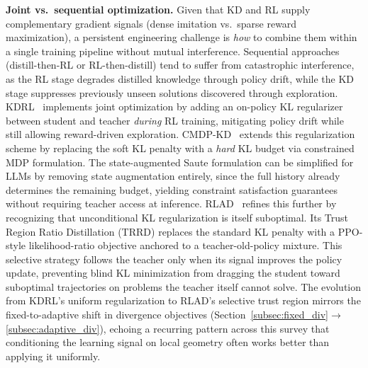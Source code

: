 \documentclass{article} %
\begin{document}
\textbf{Joint vs.\ sequential optimization.} Given that KD and RL supply complementary gradient signals (dense imitation vs.\ sparse reward maximization), a persistent engineering challenge is \emph{how} to combine them within a single training pipeline without mutual interference. Sequential approaches (distill-then-RL or RL-then-distill) tend to suffer from catastrophic interference, as the RL stage degrades distilled knowledge through policy drift, while the KD stage suppresses previously unseen solutions discovered through exploration. KDRL~\citep{2506.02208} implements joint optimization by adding an on-policy KL regularizer between student and teacher \emph{during} RL training, mitigating policy drift while still allowing reward-driven exploration. CMDP-KD~\citep{2509.22921} extends this regularization scheme by replacing the soft KL penalty with a \emph{hard} KL budget via constrained MDP formulation. The state-augmented Saute formulation can be simplified for LLMs by removing state augmentation entirely, since the full history already determines the remaining budget, yielding constraint satisfaction guarantees without requiring teacher access at inference. RLAD~\citep{2602.22495} refines this further by recognizing that unconditional KL regularization is itself suboptimal. Its Trust Region Ratio Distillation (TRRD) replaces the standard KL penalty with a PPO-style likelihood-ratio objective anchored to a teacher-old-policy mixture. This selective strategy follows the teacher only when its signal improves the policy update, preventing blind KL minimization from dragging the student toward suboptimal trajectories on problems the teacher itself cannot solve. The evolution from KDRL's uniform regularization to RLAD's selective trust region mirrors the fixed-to-adaptive shift in divergence objectives (Section~\ref{subsec:fixed_div}$\to$\ref{subsec:adaptive_div}), echoing a recurring pattern across this survey that conditioning the learning signal on local geometry often works better than applying it uniformly.
\end{document}
